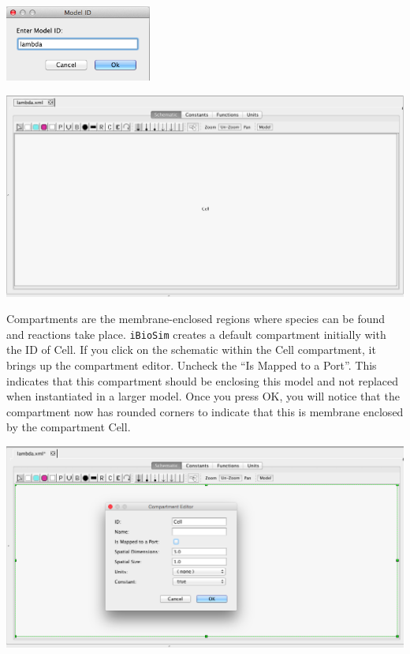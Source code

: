 \documentclass[titlepage,11pt]{article}
\begin{document}
\begin{center}
\includegraphics[height=25mm]{screenshots/ModelId}
\end{center}

\begin{center}
\includegraphics[width=160mm]{screenshots/ModelEditor}
\end{center}

Compartments are the membrane-enclosed regions where species can be found and reactions take place.  {\tt iBioSim} creates a default compartment initially with the ID of Cell.  If you click on the schematic within the Cell compartment, it brings up the compartment editor.  Uncheck the ``Is Mapped to a Port''.  This indicates that this compartment should be enclosing this model and not replaced when instantiated in a larger model.  Once you press OK, you will notice that the compartment now has rounded corners to indicate that this is membrane enclosed by the compartment Cell.

\begin{center}
\includegraphics[width=160mm]{screenshots/compartment}
\end{center}
\end{document}
